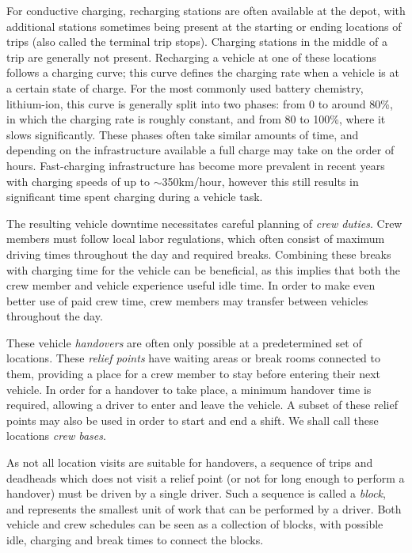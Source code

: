 \documentclass[]{article}
\begin{document}
For conductive charging, recharging stations are often available at the depot, with additional stations sometimes being present at the starting or ending locations of trips (also called the terminal trip stops). Charging stations in the middle of a trip are generally not present. Recharging a vehicle at one of these locations follows a charging curve; this curve defines the charging rate when a vehicle is at a certain state of charge. For the most commonly used battery chemistry, lithium-ion, this curve is generally split into two phases: from 0 to around 80\%, in which the charging rate is roughly constant, and from 80 to 100\%, where it slows significantly. These phases often take similar amounts of time, and depending on the infrastructure available a full charge may take on the order of hours. Fast-charging infrastructure has become more prevalent in recent years with charging speeds of up to $\sim$350km/hour, however this still results in significant time spent charging during a vehicle task.

The resulting vehicle downtime necessitates careful planning of \emph{crew duties}. Crew members must follow local labor regulations, which often consist of maximum driving times throughout the day and required breaks. Combining these breaks with charging time for the vehicle can be beneficial, as this implies that both the crew member and vehicle experience useful idle time. In order to make even better use of paid crew time, crew members may transfer between vehicles throughout the day.

These vehicle \emph{handovers} are often only possible at a predetermined set of locations. These \emph{relief points} have waiting areas or break rooms connected to them, providing a place for a crew member to stay before entering their next vehicle. In order for a handover to take place, a minimum handover time is required, allowing a driver to enter and leave the vehicle. A subset of these relief points may also be used in order to start and end a shift. We shall call these locations \emph{crew bases}. 

As not all location visits are suitable for handovers, a sequence of trips and deadheads which does not visit a relief point (or not for long enough to perform a handover) must be driven by a single driver. Such a sequence is called a \emph{block}, and represents the smallest unit of work that can be performed by a driver. Both vehicle and crew schedules can be seen as a collection of blocks, with possible idle, charging and break times to connect the blocks.
\end{document}
